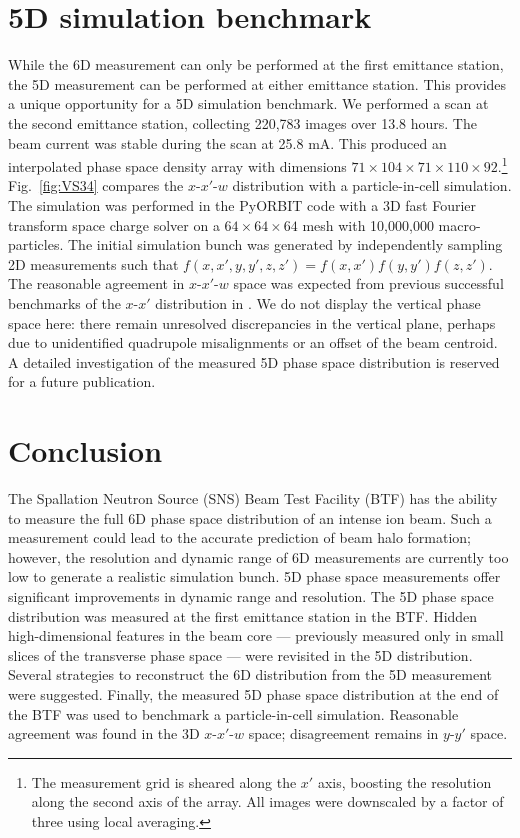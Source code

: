 \documentclass[letterpaper,
               keeplastbox,
               nospread,
               biblatex,
              ]{jacow}
\begin{document}
\section{5D simulation benchmark}

While the 6D measurement can only be performed at the first emittance station, the 5D measurement can be performed at either emittance station. This provides a unique opportunity for a 5D simulation benchmark. We performed a scan at the second emittance station, collecting 220,783 images over 13.8 hours. The beam current was stable during the scan at 25.8 mA. This produced an interpolated phase space density array with dimensions $71 \times 104 \times 71 \times 110 \times 92$.\footnote{
    The measurement grid is sheared along the $x'$ axis, boosting the resolution along the second axis of the array. All images were downscaled by a factor of three using local averaging.
} Fig.~\ref{fig:VS34} compares the $x$-$x'$-$w$ distribution with a particle-in-cell simulation. The simulation was performed in the PyORBIT code with a 3D fast Fourier transform space charge solver on a $64\times 64 \times 64$ mesh with 10,000,000 macro-particles. The initial simulation bunch was generated by independently sampling 2D measurements such that $f(x,x',y,y',z,z') = f(x,x')f(y,y')f(z,z')$. The reasonable agreement in $x$-$x'$-$w$ space was expected from previous successful benchmarks of the $x$-$x'$ distribution in \cite{Ruisard2021-IPAC}. We do not display the vertical phase space here: there remain unresolved discrepancies in the vertical plane, perhaps due to unidentified quadrupole misalignments or an offset of the beam centroid. A detailed investigation of the measured 5D phase space distribution is reserved for a future publication.



\section{Conclusion}

The Spallation Neutron Source (SNS) Beam Test Facility (BTF) has the ability to measure the full 6D phase space distribution of an intense ion beam. Such a measurement could lead to the accurate prediction of beam halo formation; however, the resolution and dynamic range of 6D measurements are currently too low to generate a realistic simulation bunch. 5D phase space measurements offer significant improvements in dynamic range and resolution. The 5D phase space distribution was measured at the first emittance station in the BTF. Hidden high-dimensional features in the beam core — previously measured only in small slices of the transverse phase space — were revisited in the 5D distribution. Several strategies to reconstruct the 6D distribution from the 5D measurement were suggested. Finally, the measured 5D phase space distribution at the end of the BTF was used to benchmark a particle-in-cell simulation. Reasonable agreement was found in the 3D $x$-$x'$-$w$ space; disagreement remains in $y$-$y'$ space. 
\end{document}
